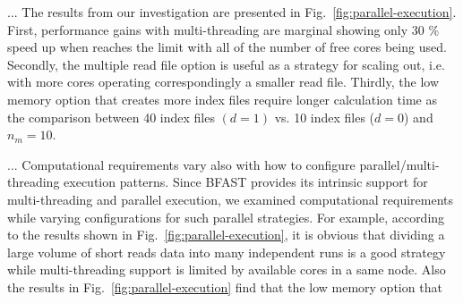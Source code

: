 \documentclass{acm_proc_article-sp}
\begin{document}
...  The results from our investigation are presented in
Fig.~\ref{fig:parallel-execution}. First, performance gains with
multi-threading are marginal showing only 30 \% speed up when reaches
the limit with all of the number of free cores being used.  Secondly,
the multiple read file option is useful as a strategy for scaling out,
i.e. with more cores operating correspondingly a smaller read file.
Thirdly, the low memory option that creates more index files require
longer calculation time as the comparison between 40 index files $(d =
1)$ vs. 10 index files ($ d = 0 $) and $n_m = 10$.


...  Computational requirements vary also with
how to configure parallel/multi-threading execution patterns.  Since
BFAST provides its intrinsic support for multi-threading and parallel
execution, we examined computational requirements while varying
configurations for such parallel strategies.  For example, according
to the results shown in Fig.~\ref{fig:parallel-execution}, it is
obvious that dividing a large volume of short reads data into many
independent runs is a good strategy while multi-threading support is
limited by available cores in a same node.  Also the results in
Fig.~\ref{fig:parallel-execution} find that the low memory option that
\end{document}
